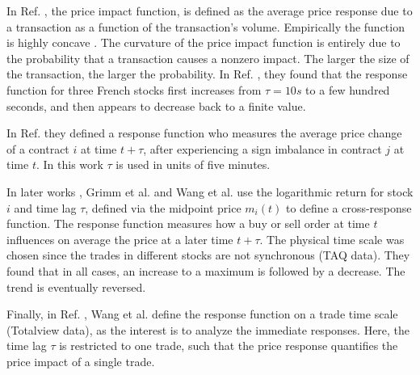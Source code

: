 In Ref. \cite{theory_market_impact}, the price impact function, is defined as
the average price response due to a transaction as a function of the
transaction's volume. Empirically the function is highly concave
\cite{theory_market_impact}. The curvature of the price impact function is
entirely due to the probability that a transaction causes a nonzero impact. The
larger the size of the transaction, the larger the probability. In Ref.
\cite{prop_order_book}, they found that the response function for three French
stocks first increases from $\tau = 10s$ to a few hundred seconds, and then
appears to decrease back to a finite value.

In Ref. \cite{dissecting_cross} they defined a response function who measures
the average price change of a contract $i$ at time $t+\tau$, after experiencing
a sign imbalance in contract $j$ at time $t$. In this work $\tau$ is used in
units of five minutes.

In later works \cite{spread_changes_affect,Wang_2016_cross}, Grimm et al.
and Wang et al. use the logarithmic return for stock $i$ and time lag $\tau$,
defined via the midpoint price $m_{i} \left( t \right)$ to define a
cross-response function. The response function measures how a buy or sell order
at time $t$ influences on average the price at a later time $t + \tau$.
The physical time scale was chosen since the trades in different stocks are not
synchronous (TAQ data). They found that in all cases, an increase  to a
maximum is followed by a decrease. The trend is eventually reversed.

Finally, in Ref. \cite{Wang_2018_b}, Wang et al. define the response function
on a trade time scale (Totalview data), as the interest is to analyze the
immediate responses. Here, the time lag $\tau$ is restricted to one trade, such
that the price response quantifies the price impact of a single trade.
